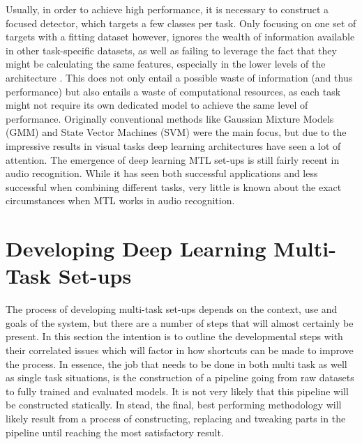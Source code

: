 Usually, in order to achieve high performance, it is necessary to construct a focused detector, which targets a few classes per task. Only focusing on one set of targets with a fitting dataset however, ignores the wealth of information available in other task-specific datasets, as well as failing to leverage the fact that they might be calculating the same features, especially in the lower levels of the architecture \citep{tagliasacchi2020multi}. This does not only entail a possible waste of information (and thus performance) but also entails a waste of computational resources, as each task might not require its own dedicated model to achieve the same level of performance. Originally conventional methods like Gaussian Mixture Models (GMM) and State Vector Machines (SVM) were the main focus, but due to the impressive results in visual tasks deep learning architectures have seen a lot of attention.  The emergence of deep learning MTL set-ups is still fairly recent in audio recognition. While it has seen both successful \citep{tonami2019joint} applications and less successful \citep{sakti2016deep} when combining different tasks, very little is known about the exact circumstances when MTL works in audio recognition.\\

\section{Developing Deep Learning Multi-Task Set-ups}

The process of developing multi-task set-ups depends on the context, use and goals of the system, but there are a number of steps that will almost certainly be present. In this section the intention is to outline the developmental steps with their correlated issues which will factor in how shortcuts can be made to improve the process. In essence, the job that needs to be done in both multi task as well as single task situations, is the construction of a pipeline going from raw datasets to fully trained and evaluated models. It is not very likely that this pipeline will be constructed statically. In stead, the final, best performing methodology will likely result from a process of constructing, replacing and tweaking parts in the pipeline until reaching the most satisfactory result.\\


